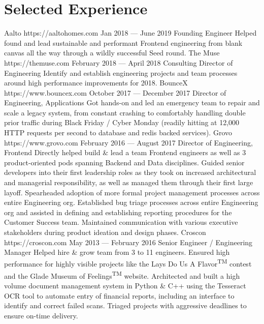 \documentclass{resume}
\begin{document}
\smallskip

\section{Selected Experience}

\employer
    {Aalto}
    {https://aaltohomes.com}
    {Jan 2018 --- June 2019}
    {Founding Engineer}
    {Helped found and lead sustainable and performant Frontend engineering from blank canvas all the way through a wildly successful Seed round.}
\employer
    {The Muse}
    {https://themuse.com}
    {February 2018 --- April 2018}
    {Consulting Director of Engineering}
    {Identify and establish engineering projects and team processes around high performance improvements for 2018.}
\employer
    {BounceX}
    {https://www.bouncex.com}
    {October 2017 --- December 2017}
    {Director of Engineering, Applications}
    {Got hands-on and led an emergency team to repair and scale a legacy system, from constant crashing to comfortably handling double prior traffic during Black Friday / Cyber Monday (readily hitting at 12,000 HTTP requests per second to database and redis backed services).}
\employer
    {Grovo}
    {https://www.grovo.com}
    {February 2016 --- August 2017}
    {Director of Engineering, Frontend}
    {Directly helped build \& lead a team Frontend engineers as well as 3 product-oriented pods spanning Backend and Data disciplines. Guided senior developers into their first leadership roles as they took on increased architectural and managerial responsibility, as well as managed them through their first large layoff. Spearheaded adoption of more formal project management processes across entire Engineering org. Established bug triage processes across entire Engineering org and assisted in defining and establishing reporting procedures for the Customer Success team. Maintained communication with various executive stakeholders during product ideation and design phases.}
\employer
    {Croscon}
    {https://croscon.com}
    {May 2013 --- February 2016}
    {Senior Engineer / Engineering Manager}
    {Helped hire \& grow team from 3 to 11 engineers. Ensured high performance for highly visible projects like the Lays\textsuperscript{\textregistered} Do Us A Flavor\textsuperscript{TM} contest and the Glade\textsuperscript{\textregistered} Museum of Feelings\textsuperscript{TM} website. Architected and built a high volume document management system in Python \& C++ using the Tesseract OCR tool to automate entry of financial reports, including an interface to identify and correct failed scans. Triaged projects with aggressive deadlines to ensure on-time delivery.}
\end{document}
